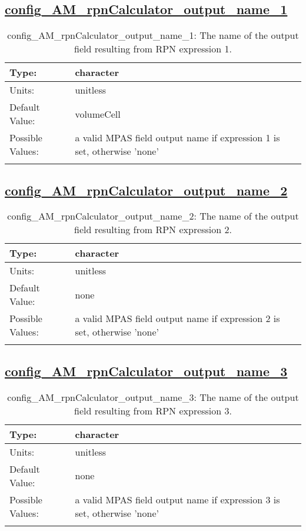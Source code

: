 \subsection[config\_AM\_rpnCalculator\_output\_name\_1]{\hyperref[sec:nm_tab_AM_rpnCalculator]{config\_AM\_rpnCalculator\_output\_name\_1}}
\label{subsec:nm_sec_config_AM_rpnCalculator_output_name_1}
\begin{center}
\begin{longtable}{| p{2.0in} || p{4.0in} |}
    \hline
    Type: & character \\
    \hline
    Units: & \si{unitless} \\
    \hline
    Default Value: & volumeCell \\
    \hline
    Possible Values: & a valid MPAS field output name if expression 1 is set, otherwise 'none' \\
    \hline
    \caption{config\_AM\_rpnCalculator\_output\_name\_1: The name of the output field resulting from RPN expression 1.}
\end{longtable}
\end{center}
\subsection[config\_AM\_rpnCalculator\_output\_name\_2]{\hyperref[sec:nm_tab_AM_rpnCalculator]{config\_AM\_rpnCalculator\_output\_name\_2}}
\label{subsec:nm_sec_config_AM_rpnCalculator_output_name_2}
\begin{center}
\begin{longtable}{| p{2.0in} || p{4.0in} |}
    \hline
    Type: & character \\
    \hline
    Units: & \si{unitless} \\
    \hline
    Default Value: & none \\
    \hline
    Possible Values: & a valid MPAS field output name if expression 2 is set, otherwise 'none' \\
    \hline
    \caption{config\_AM\_rpnCalculator\_output\_name\_2: The name of the output field resulting from RPN expression 2.}
\end{longtable}
\end{center}
\subsection[config\_AM\_rpnCalculator\_output\_name\_3]{\hyperref[sec:nm_tab_AM_rpnCalculator]{config\_AM\_rpnCalculator\_output\_name\_3}}
\label{subsec:nm_sec_config_AM_rpnCalculator_output_name_3}
\begin{center}
\begin{longtable}{| p{2.0in} || p{4.0in} |}
    \hline
    Type: & character \\
    \hline
    Units: & \si{unitless} \\
    \hline
    Default Value: & none \\
    \hline
    Possible Values: & a valid MPAS field output name if expression 3 is set, otherwise 'none' \\
    \hline
    \caption{config\_AM\_rpnCalculator\_output\_name\_3: The name of the output field resulting from RPN expression 3.}
\end{longtable}
\end{center}
